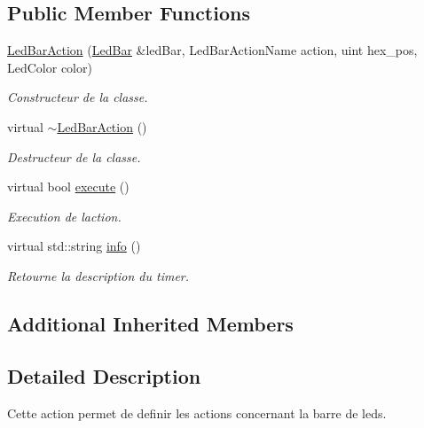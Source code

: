 \subsection*{Public Member Functions}
\begin{DoxyCompactItemize}
\item 
\hyperlink{classLedBarAction_adcaf979c06f6f0db45ebc191526bbcf5}{Led\+Bar\+Action} (\hyperlink{classLedBar}{Led\+Bar} \&led\+Bar, Led\+Bar\+Action\+Name action, uint hex\+\_\+pos, Led\+Color color)
\begin{DoxyCompactList}\small\item\em Constructeur de la classe. \end{DoxyCompactList}\item 
\mbox{\label{classLedBarAction_a8d096b40a25f81b4b7a3f6180b8bab8d}} 
virtual \hyperlink{classLedBarAction_a8d096b40a25f81b4b7a3f6180b8bab8d}{$\sim$\+Led\+Bar\+Action} ()
\begin{DoxyCompactList}\small\item\em Destructeur de la classe. \end{DoxyCompactList}\item 
\mbox{\label{classLedBarAction_a67bc2c636064156c80319623b88ec5e8}} 
virtual bool \hyperlink{classLedBarAction_a67bc2c636064156c80319623b88ec5e8}{execute} ()
\begin{DoxyCompactList}\small\item\em Execution de l\textquotesingle{}action. \end{DoxyCompactList}\item 
\mbox{\label{classLedBarAction_a58501cb3d64b6ceaea8a83cefc230f42}} 
virtual std\+::string \hyperlink{classLedBarAction_a58501cb3d64b6ceaea8a83cefc230f42}{info} ()
\begin{DoxyCompactList}\small\item\em Retourne la description du timer. \end{DoxyCompactList}\end{DoxyCompactItemize}
\subsection*{Additional Inherited Members}


\subsection{Detailed Description}
Cette action permet de definir les actions concernant la barre de leds. 

